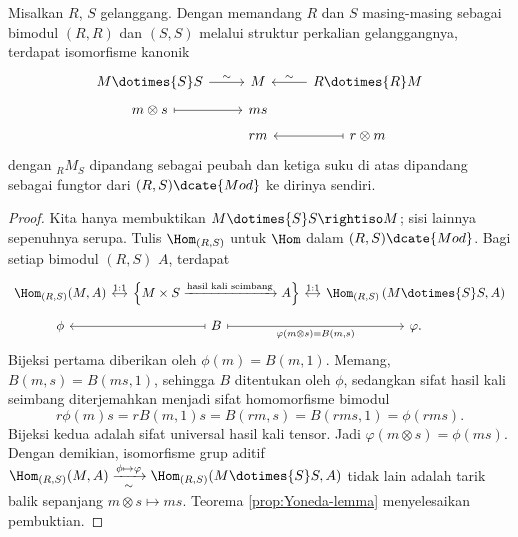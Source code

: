 \begin{proposition}\label{prop:tensor-unit}
	Misalkan $R$, $S$ gelanggang. Dengan memandang $R$ dan $S$ masing-masing sebagai bimodul $(R, R)$ dan $(S, S)$ melalui struktur perkalian gelanggangnya, terdapat isomorfisme kanonik
	\[ \begin{tikzcd}[row sep=tiny]
		M \dotimes{S} S \arrow[r, "\sim"] & M & R \dotimes{R} M \arrow[l, "\sim"'] \\
		m \otimes s \arrow[mapsto, r] & ms & \\
		& rm & r \otimes m \arrow[mapsto, l]
	\end{tikzcd} \]
	dengan ${}_R M_S$ dipandang sebagai peubah dan ketiga suku di atas dipandang sebagai fungtor dari $(R, S)\dcate{Mod}$ ke dirinya sendiri.
\end{proposition}
\begin{proof}
	Kita hanya membuktikan $M \dotimes{S} S \rightiso M$; sisi lainnya sepenuhnya serupa. Tulis $\Hom_{(R,S)}$ untuk $\Hom$ dalam $(R,S)\dcate{Mod}$. Bagi setiap bimodul $(R, S)$ $A$, terdapat
	\[\begin{tikzcd}[column sep=small, row sep=tiny]
		\Hom_{(R,S)}(M, A) \arrow[leftrightarrow, r, "1:1"] & \left\{ M \times S \xrightarrow{\text{hasil kali seimbang}} A \right\} \arrow[leftrightarrow, r, "1:1"] & \Hom_{(R,S)}\left( M \dotimes{S} S, A \right) \\
		\phi & B \arrow[mapsto, l] \arrow[mapsto, r, "{\varphi(m \otimes s)=B(m,s)}"'] & \varphi.
	\end{tikzcd}\]
	Bijeksi pertama diberikan oleh $\phi(m)=B(m,1)$. Memang, $B(m,s) = B(ms,1)$, sehingga $B$ ditentukan oleh $\phi$, sedangkan sifat hasil kali seimbang diterjemahkan menjadi sifat homomorfisme bimodul
	\[ r\phi(m)s = r B(m, 1)s = B(rm, s) = B(rms, 1) = \phi(rms). \]
	Bijeksi kedua adalah sifat universal hasil kali tensor. Jadi $\varphi(m \otimes s) = \phi(ms)$. Dengan demikian, isomorfisme grup aditif $\Hom_{(R,S)}(M, A) \xrightarrow[\sim]{\phi \mapsto \varphi} \Hom_{(R,S)}(M \dotimes{S} S, A)$ tidak lain adalah tarik balik sepanjang $m \otimes s \mapsto ms$. Teorema \ref{prop:Yoneda-lemma} menyelesaikan pembuktian.
\end{proof}

